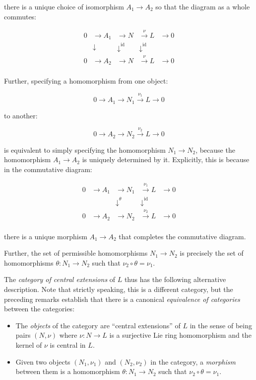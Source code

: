 there is a unique choice of isomorphism $A_1 \to A_2$ so that the
diagram as a whole commutes:

$$\begin{array}{rrrrr}
  0 & \to A_1 & \to N & \stackrel{\nu}{\to} L & \to 0 \\
  & \downarrow & \downarrow^{\text{id}} & \downarrow^{\text{id}} &\\
  0 & \to A_2 & \to N & \stackrel{\nu}{\to} L & \to 0 \\
\end{array}$$

Further, specifying a homomorphism from one object:

$$0 \to A_1 \to N_1 \stackrel{\nu_1}{\to} L \to 0$$

to another:

$$0 \to A_2 \to N_2 \stackrel{\nu_2}{\to} L \to 0$$

is equivalent to simply specifying the homomorphism $N_1 \to N_2$,
because the homomorphism $A_1 \to A_2$ is uniquely determined by
it. Explicitly, this is because in the commutative diagram:

$$\begin{array}{rrrrr}
  0 & \to A_1 & \to N_1 & \stackrel{\nu_1}{\to} L & \to 0 \\
  &  & \downarrow^{\theta} & \downarrow^{\text{id}} &\\
  0 & \to A_2 & \to N_2 & \stackrel{\nu_2}{\to} L & \to 0 \\
\end{array}$$

there is a unique morphism $A_1 \to A_2$ that completes the
commutative diagram.

Further, the set of permissible homomorphisms
$N_1 \to N_2$ is precisely the set of homomorphisms $\theta: N_1 \to
N_2$ such that $\nu_2 \circ \theta = \nu_1$.

The {\em category of central extensions} of $L$ thus has the following
alternative description. Note that strictly speaking, this is a
different category, but the preceding remarks establish that there is
a canonical {\em equivalence of categories} between the categories:

\begin{itemize}
\item The {\em objects} of the category are ``central extensions'' of
  $L$ in the sense of being pairs $(N,\nu)$ where $\nu:N \to L$ is a
  surjective Lie ring homomorphism and the kernel of $\nu$ is central
  in $L$.
\item Given two objects $(N_1,\nu_1)$ and $(N_2,\nu_2)$ in the
  category, a {\em morphism} between them is a homomorphism $\theta:
  N_1 \to N_2$ such that $\nu_2 \circ \theta = \nu_1$.
\end{itemize}

